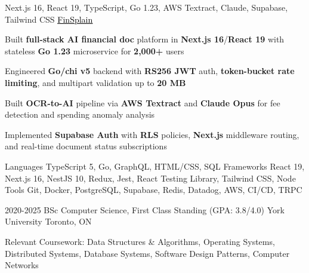 \documentclass[11pt, a4paper]{awesome-cv}
\begin{document}
\begin{cventries}
\end{cventries}


\begin{cventries}

  \cventry
  {Next.js 16, React 19, TypeScript, Go 1.23, AWS Textract, Claude, Supabase, Tailwind CSS}
  {\href{https://finsplain.net}{\textcolor{black}{\underline{FinSplain}} \faExternalLink}}
  {}
  {}
  {
    \begin{cvitems}
      \item {Built \textbf{full-stack AI financial doc} platform in \textbf{Next.js 16}/\textbf{React 19} with stateless \textbf{Go 1.23} microservice for \textbf{2,000+} users}
      \item {Engineered \textbf{Go/chi v5} backend with \textbf{RS256 JWT} auth, \textbf{token-bucket rate limiting}, and multipart validation up to \textbf{20 MB}}
      \item {Built \textbf{OCR-to-AI} pipeline via \textbf{AWS Textract} and \textbf{Claude Opus} for fee detection and spending anomaly analysis}
      \item {Implemented \textbf{Supabase Auth} with \textbf{RLS} policies, \textbf{Next.js} middleware routing, and real-time document status subscriptions}
    \end{cvitems}
  }

\end{cventries}


\begin{cvskills}
  \cvskill
  {Languages}
  {TypeScript 5, Go, GraphQL, HTML/CSS, SQL}
  \cvskill
  {Frameworks}
  {React 19, Next.js 16, NestJS 10, Redux, Jest, React Testing Library, Tailwind CSS, Node}
  \cvskill
  {Tools}
  {Git, Docker, PostgreSQL, Supabase, Redis, Datadog, AWS, CI/CD, TRPC}
\end{cvskills}

\vspace{-2mm}

\begin{cventries}
  \cventry
  {2020-2025}
  {BSc Computer Science, First Class Standing (GPA: 3.8/4.0)}
  {York University}
  {Toronto, ON}
  {%
    \begin{cvitems}
      \item {Relevant Coursework: Data Structures \& Algorithms, Operating Systems, Distributed Systems, Database Systems, Software Design Patterns, Computer Networks}
    \end{cvitems}
  }
\end{cventries}

\end{document}
